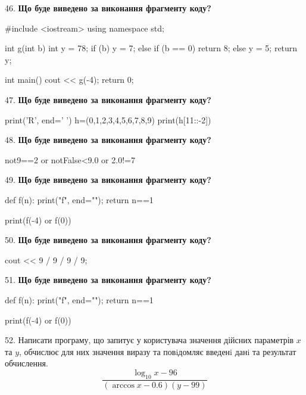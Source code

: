 \documentclass[11pt]{article}
\begin{document}
46. \textbf{Що буде виведено за виконання фрагменту коду?}

#include <iostream>
using namespace std;

int g(int b){
    int y = 78;
    if (b) 
        y = 7;
    else if (b == 0)
         return 8;
    else
         y = 5;
    return y;
}

int main(){
    cout << g(-4);
    return 0;
}

\par\vspace{5mm}

47. \textbf{Що буде виведено за виконання фрагменту коду?}

print('R', end=' ')
h=(0,1,2,3,4,5,6,7,8,9)
print(h[11::-2])

\par\vspace{5mm}

48. \textbf{Що буде виведено за виконання фрагменту коду?}

not9==2 or notFalse<9.0 or 2.0!=7
\par\vspace{5mm}

49. \textbf{Що буде виведено за виконання фрагменту коду?}

def f(n):
    print("f", end="");
    return n==1

print(f(-4) or f(0))
\par\vspace{5mm}

50. \textbf{Що буде виведено за виконання фрагменту коду?}

cout << 9 / 9 / 9 / 9;
\par\vspace{5mm}

51. \textbf{Що буде виведено за виконання фрагменту коду?}

def f(n):
    print("f", end="");
    return n==1

print(f(-4) or f(0))
\par\vspace{5mm}

52. 
Написати програму, що запитує у користувача значення дійсних параметрів $x$ та $y$, обчислює для них значення виразу та повiдомляє введенi данi та результат обчислення.
$$\frac{\log_{10} x - 96}{(\arccos x - 0.6) (y - 99)}$$ 
\end{document}
